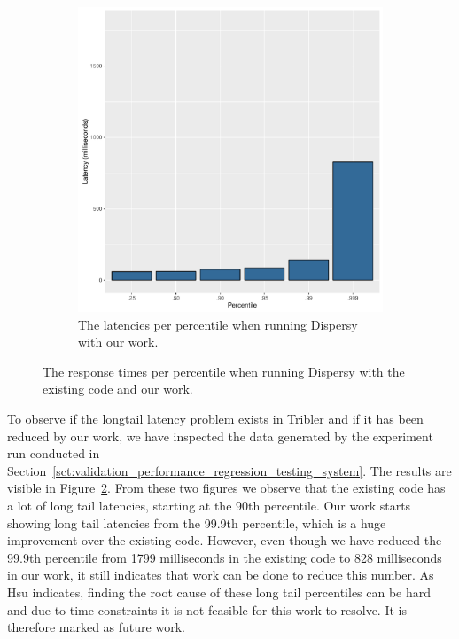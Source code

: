\begin{figure}[h]
\begin{subfigure}[b]{.5\linewidth}
		\includegraphics[width=\textwidth]{experimentation/images/response_time_percentiles_async}
		\caption{The latencies per percentile when running Dispersy with our work.}
		\label{fig:response_times_percentiles_async}
	\end{subfigure}
	\caption{The response times per percentile when running Dispersy with the existing code and our work.}
	\label{fig:resposne_times_percentiles}
\end{figure}

To observe if the longtail latency problem exists in Tribler and if it has been reduced by our work, we have inspected the data generated by the experiment run conducted in Section~\ref{sct:validation_performance_regression_testing_system}.
The results are visible in Figure~\ref{fig:resposne_times_percentiles}.
From these two figures we observe that the existing code has a lot of long tail latencies, starting at the 90th percentile.
Our work starts showing long tail latencies from the 99.9th percentile, which is a huge improvement over the existing code.
However, even though we have reduced the 99.9th percentile from 1799 milliseconds in the existing code to 828 milliseconds in our work, it still indicates that work can be done to reduce this number.
As Hsu indicates, finding the root cause of these long tail percentiles can be hard and due to time constraints it is not feasible for this work to resolve.
It is therefore marked as future work.

